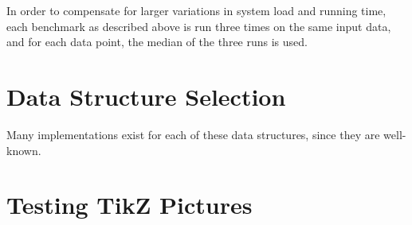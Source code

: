 \documentclass{article}
\begin{document}
In order to compensate for larger variations in system load and running time, each benchmark as described above is run three times on the same input data, and for each data point, the median of the three runs is used.

\section{Data Structure Selection}
Many implementations exist for each of these data structures, since they are well-known. 

\newpage
\section{Testing TikZ Pictures}


\end{document}
